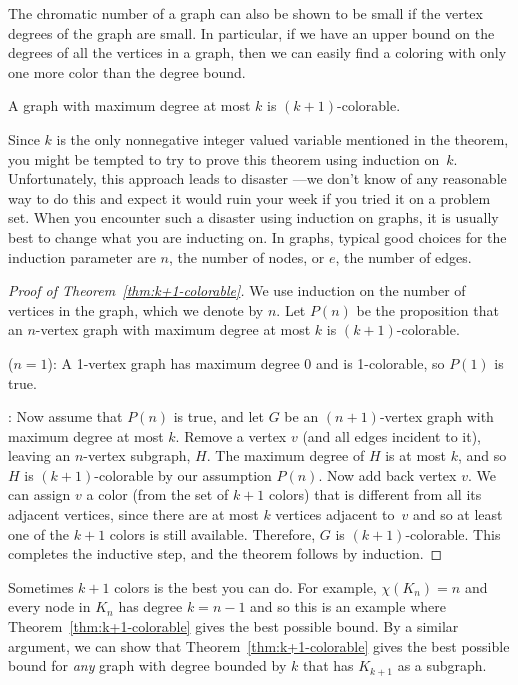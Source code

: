 The chromatic number of a graph can also be shown to be small if the
vertex degrees of the graph are small.  In particular, if we have an
upper bound on the degrees of all the vertices in a graph, then we can
easily find a coloring with only one more color than the degree bound.

\begin{theorem}\label{thm:k+1-colorable}
A graph with maximum degree at most $k$ is $(k+1)$-colorable.
\end{theorem}

Since $k$ is the only nonnegative integer valued variable mentioned in the
theorem, you might be tempted to try to prove this theorem using induction
on~$k$.  Unfortunately, this approach leads to disaster ---we don't know of
any reasonable way to do this and expect it would ruin your week if you
tried it on a problem set.  When you encounter such a disaster using
induction on graphs, it is usually best to change what you are inducting
on.  In graphs, typical good choices for the induction parameter are $n$,
the number of nodes, or $e$, the number of edges.

\begin{proof}[Proof of Theorem~\ref{thm:k+1-colorable}]
We use induction on the number of vertices in the graph, which we
denote by $n$.  Let $P(n)$ be the proposition that an $n$-vertex graph
with maximum degree at most $k$ is $(k+1)$-colorable.

 ($n=1$): A 1-vertex graph has maximum degree
0 and is 1-colorable, so $P(1)$ is true.

: Now assume that $P(n)$ is true, and
let $G$ be an $(n+1)$-vertex graph with maximum degree at most $k$.
Remove a vertex $v$ (and all edges incident to it), leaving an
$n$-vertex subgraph, $H$.  The maximum degree of $H$ is at most $k$,
and so $H$ is $(k+1)$-colorable by our assumption $P(n)$.  Now add
back vertex $v$.  We can assign $v$ a color (from the set of $k + 1$
colors) that is different from all its adjacent vertices, since there
are at most $k$ vertices adjacent to~$v$ and so at least one of the
$k+1$ colors is still available.  Therefore, $G$ is $(k+1)$-colorable.
This completes the inductive step, and the theorem follows by
induction.
\end{proof}

Sometimes $k+1$ colors is the best you can do.  For example, $\chi(K_n) = n$
and every node in $K_n$ has degree $k = n - 1$ and so this is an example where
Theorem~\ref{thm:k+1-colorable} gives the best possible bound.  By a
similar argument, we can show that Theorem~\ref{thm:k+1-colorable} gives
the best possible bound for \emph{any} graph with degree bounded by
$k$ that has $K_{k+1}$ as a subgraph.

